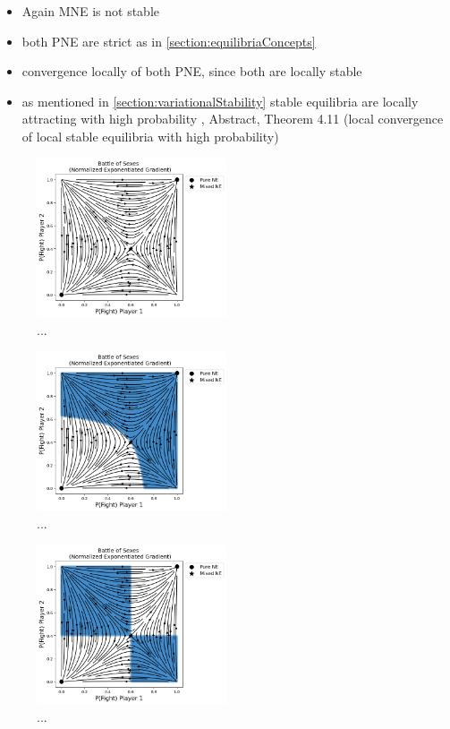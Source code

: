 \begin{itemize}
    \item Again MNE is not stable
    \item both PNE are strict as in \ref{section:equilibriaConcepts}
    \item convergence locally of both PNE, since both are locally stable
    \item as mentioned in \ref{section:variationalStability} stable equilibria are locally attracting with high probability \cite{mertikopoulos}, Abstract, Theorem 4.11 (local convergence of local stable equilibria with high probability) 
\end{itemize}

\begin{figure}
    \centering
    \includegraphics[width=0.5\textwidth]{logos/BattleOfSexes1.png}
    \caption{...}
    \label{BattleOfSexes1}
\end{figure}

\begin{figure}
    \centering
    \includegraphics[width=0.5\textwidth]{logos/BattleOfSexes2.png}
    \caption{...}
    \label{BattleOfSexes2}
\end{figure}

\begin{figure}
    \centering
    \includegraphics[width=0.5\textwidth]{logos/BattleOfSexes3.png}
    \caption{...}
    \label{BattleOfSexes3}
\end{figure}

